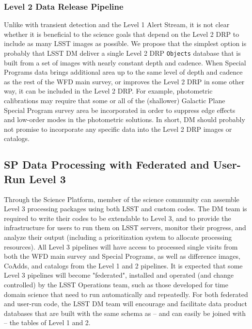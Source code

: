 \documentclass[DM,lsstdraft,toc]{lsstdoc}
\begin{document}
\subsubsection{Level 2 Data Release Pipeline}\label{ssec:dmdocs_SPinWFD_L2}

Unlike with transient detection and the Level 1 Alert Stream, it is not clear whether it is beneficial to the science goals that depend on the Level 2 DRP to include as many LSST images as possible. We propose that the simplest option is probably that LSST DM deliver a single Level 2 DRP {\tt Objects} database that is built from a set of images with nearly constant depth and cadence. When Special Programs data brings additional area up to the same level of depth and cadence as the rest of the WFD main survey, or improves the Level 2 DRP in some other way, it can be included in the Level 2 DRP. For example, photometric calibrations may require that some or all of the (shallower) Galactic Plane Special Program survey area be incorporated in order to suppress edge effects and low-order modes in the photometric solutions. In short, DM should probably not promise to incorporate any specific data into the Level 2 DRP images or catalogs.

\subsection{SP Data Processing with Federated and User-Run Level 3}\label{ssec:dmdocs_L3}

Through the Science Platform, member of the science community can assemble Level 3 processing packages using both LSST and custom codes. The DM team is required to write their codes to be extendable to Level 3, and to provide the infrastructure for users to run them on LSST servers, monitor their progress, and analyze their output (including a prioritization system to allocate processing resources). All Level 3 pipelines will have access to processed single visits from both the WFD main survey and Special Programs, as well as difference images, CoAdds, and catalogs from the Level 1 and 2 pipelines. It is expected that some Level 3 pipelines will become "federated", installed and operated (and change controlled) by the LSST Operations team, such as those developed for time domain science that need to run automatically and repeatedly. For both federated and user-run code, the LSST DM team will encourage and facilitate data product databases that are built with the same schema as -- and can easily be joined with -- the tables of Level 1 and 2.
\end{document}
